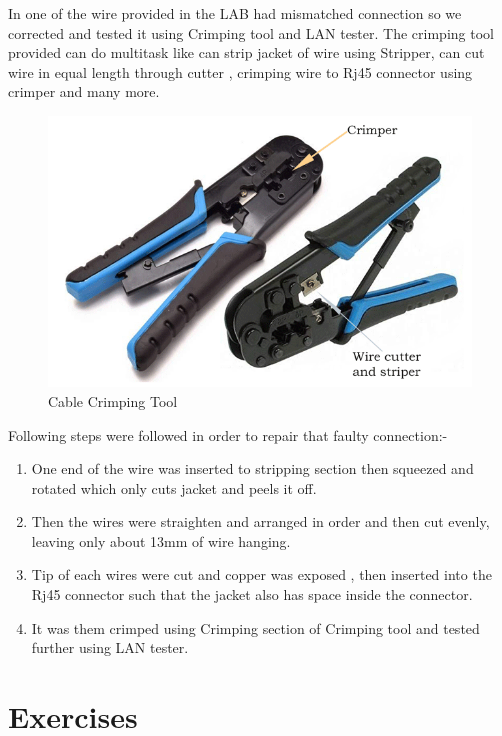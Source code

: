 \documentclass[a4paper,12pt]{article}
\begin{document}
In one of the wire provided in the LAB  had mismatched connection so we corrected and
 tested it using  Crimping tool and LAN tester. The crimping tool provided can do multitask like can strip jacket of wire using Stripper,
 can cut wire in equal length through cutter , crimping wire to Rj45 connector using crimper and many more. 
\begin{figure}[H]
    \centering
    \includegraphics[scale=0.7,cframe=blue 0.5pt 3pt]{crimper-tool.png}
    \caption{Cable Crimping Tool}
\end{figure}

Following steps were followed in order to repair that faulty connection:-

\begin{enumerate}
    \item  One end of the wire was inserted to  stripping section then squeezed and rotated  which only cuts jacket and peels it off.
    \item Then the wires were straighten and arranged in order and then cut evenly, leaving only about 13mm of wire hanging.
    \item Tip of each wires were cut and copper was exposed , then inserted into the Rj45 connector such that the jacket also has space inside the connector.
    \item It was them crimped using Crimping section of Crimping tool and tested further using LAN tester.
\end{enumerate}

\pagebreak

\section{Exercises}
\end{document}
